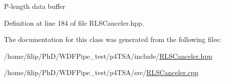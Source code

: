 P-\/length data buffer 

Definition at line 184 of file R\+L\+S\+Canceler.\+hpp.



The documentation for this class was generated from the following files\+:\begin{DoxyCompactItemize}
\item 
/home/filip/\+Ph\+D/\+W\+D\+F\+Pipe\+\_\+test/p4\+T\+S\+A/include/\hyperlink{_r_l_s_canceler_8hpp}{R\+L\+S\+Canceler.\+hpp}\item 
/home/filip/\+Ph\+D/\+W\+D\+F\+Pipe\+\_\+test/p4\+T\+S\+A/src/\hyperlink{_r_l_s_canceler_8cpp}{R\+L\+S\+Canceler.\+cpp}\end{DoxyCompactItemize}
